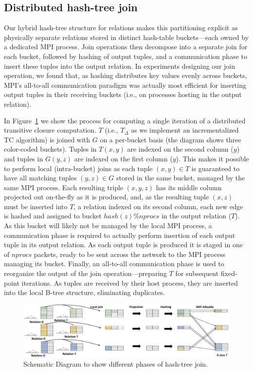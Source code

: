 \subsection{Distributed hash-tree join}

Our hybrid hash-tree structure for relations makes this partitioning explicit as physically separate relations stored in distinct hash-table buckets---each owned by a dedicated MPI process. Join operations then decompose into a separate join for each bucket, followed by hashing of output tuples, and a communication phase to insert these tuples into the output relation. In experiments designing our join operation, we found that, as hashing distributes key values evenly across buckets, MPI's all-to-all communication paradigm was actually most efficient for inserting output tuples in their receiving buckets (i.e., on processes hosting in the output relation).

In Figure~\ref{fig:join} we show the process for computing a single iteration of a distributed transitive closure computation. $T$ (i.e., $T_\Delta$ as we implement an incrementalized TC algorithm) is joined with $G$ on a per-bucket basis (the diagram shows three color-coded buckets). Tuples in $T(x,y)$ are indexed on the second column ($y$) and tuples in $G(y,z)$ are indexed on the first column ($y$). This makes it possible to perform local (intra-bucket) joins as each tuple $(x,y) \in T$ is guaranteed to have all matching tuples $(y,z) \in G$ stored in the same bucket, managed by the same MPI process. Each resulting triple $(x,y,z)$ has its middle column projected out on-the-fly as it is produced, and, as the resulting tuple $(x,z)$ must be inserted into $T$, a relation indexed on its second column, each new edge is hashed and assigned to bucket $\mathit{hash}(z)\%\mathit{nprocs}$ in the output relation ($T$). As this bucket will likely not be managed by the local MPI process, a communication phase is required to actually perform insertion of each output tuple in its output relation. As each output tuple is produced it is staged in one of $\mathit{nprocs}$ packets, ready to be sent across the network to the MPI process managing its bucket. Finally, an all-to-all communication phase is used to reorganize the output of the join operation---preparing $T$ for subsequent fixed-point iterations. As tuples are received by their host process, they are inserted into the local B-tree structure, eliminating duplicates.  


\begin{figure}[h]
	\includegraphics[width=\textwidth]{results/join_new.pdf}
	\caption{Schematic Diagram to show different phases of hash-tree join.}
	\label{fig:join}
\end{figure}



